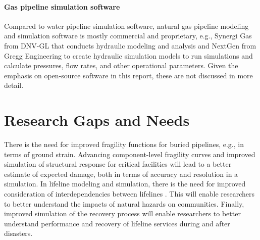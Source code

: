 \paragraph{Gas pipeline simulation software} Compared to water pipeline simulation software, natural gas pipeline modeling and simulation software is mostly commercial and proprietary, e.g., Synergi Gas from DNV-GL that conducts hydraulic modeling and analysis and NextGen from Gregg Engineering to create hydraulic simulation models to run simulations and calculate pressures, flow rates, and other operational parameters. Given the emphasis on open-source software in this report, these are not discussed in more detail.

\section{Research Gaps and Needs}
\label{sec:perf_pipeline_gaps}

There is the need for improved fragility functions for buried pipelines, e.g., in terms of ground strain. Advancing component-level fragility curves and improved simulation of structural response for critical facilities will lead to a better estimate of expected damage, both in terms of accuracy and resolution in a simulation. In lifeline modeling and simulation, there is the need for improved consideration of interdependencies between lifelines \citep{duenas-osorio2007seismic, johansen2018probabilistic}. This will enable researchers to better understand the impacts of natural hazards on communities. Finally, improved simulation of the recovery process \citep{tabucchi2010simulation, he2019disaster, tomar2020hindcasting} will enable researchers to better understand performance and recovery of lifeline services during and after disasters.






